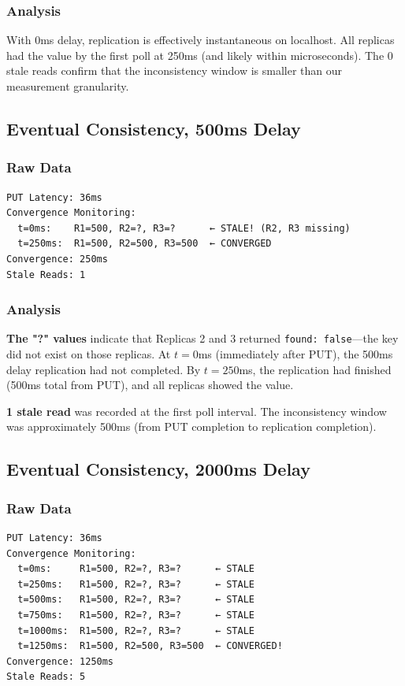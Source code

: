 \documentclass[10pt,a4paper]{article}
\begin{document}
\subsubsection{Analysis}

With 0ms delay, replication is effectively instantaneous on localhost. All replicas had the value by the first poll at 250ms (and likely within microseconds). The 0 stale reads confirm that the inconsistency window is smaller than our measurement granularity.

\subsection{Eventual Consistency, 500ms Delay}

\subsubsection{Raw Data}
\begin{verbatim}
PUT Latency: 36ms
Convergence Monitoring:
  t=0ms:    R1=500, R2=?, R3=?      ← STALE! (R2, R3 missing)
  t=250ms:  R1=500, R2=500, R3=500  ← CONVERGED
Convergence: 250ms
Stale Reads: 1
\end{verbatim}

\subsubsection{Analysis}

\textbf{The "?" values} indicate that Replicas 2 and 3 returned \texttt{found: false}---the key did not exist on those replicas. At $t=0$ms (immediately after PUT), the 500ms delay replication had not completed. By $t=250$ms, the replication had finished (500ms total from PUT), and all replicas showed the value.

\textbf{1 stale read} was recorded at the first poll interval. The inconsistency window was approximately 500ms (from PUT completion to replication completion).

\subsection{Eventual Consistency, 2000ms Delay}

\subsubsection{Raw Data}
\begin{verbatim}
PUT Latency: 36ms
Convergence Monitoring:
  t=0ms:     R1=500, R2=?, R3=?      ← STALE
  t=250ms:   R1=500, R2=?, R3=?      ← STALE
  t=500ms:   R1=500, R2=?, R3=?      ← STALE
  t=750ms:   R1=500, R2=?, R3=?      ← STALE
  t=1000ms:  R1=500, R2=?, R3=?      ← STALE
  t=1250ms:  R1=500, R2=500, R3=500  ← CONVERGED!
Convergence: 1250ms
Stale Reads: 5
\end{verbatim}
\end{document}
